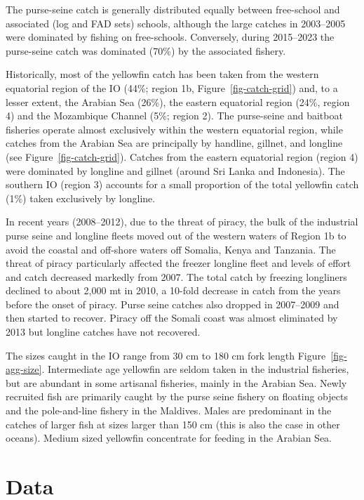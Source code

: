 \documentclass[
]{scrartcl}
\begin{document}
The purse-seine catch is generally distributed equally between
free-school and associated (log and FAD sets) schools, although the
large catches in 2003--2005 were dominated by fishing on free-schools.
Conversely, during 2015--2023 the purse-seine catch was dominated (70\%)
by the associated fishery.

Historically, most of the yellowfin catch has been taken from the
western equatorial region of the IO (44\%; region 1b,
Figure~\ref{fig-catch-grid}) and, to a lesser extent, the Arabian Sea
(26\%), the eastern equatorial region (24\%, region 4) and the
Mozambique Channel (5\%; region 2). The purse-seine and baitboat
fisheries operate almost exclusively within the western equatorial
region, while catches from the Arabian Sea are principally by handline,
gillnet, and longline (see Figure~\ref{fig-catch-grid}). Catches from
the eastern equatorial region (region 4) were dominated by longline and
gillnet (around Sri Lanka and Indonesia). The southern IO (region 3)
accounts for a small proportion of the total yellowfin catch (1\%) taken
exclusively by longline.

In recent years (2008--2012), due to the threat of piracy, the bulk of
the industrial purse seine and longline fleets moved out of the western
waters of Region 1b to avoid the coastal and off-shore waters off
Somalia, Kenya and Tanzania. The threat of piracy particularly affected
the freezer longline fleet and levels of effort and catch decreased
markedly from 2007. The total catch by freezing longliners declined to
about 2,000 mt in 2010, a 10-fold decrease in catch from the years
before the onset of piracy. Purse seine catches also dropped in
2007--2009 and then started to recover. Piracy off the Somali coast was
almost eliminated by 2013 but longline catches have not recovered.

The sizes caught in the IO range from 30 cm to 180 cm fork length
Figure~\ref{fig-agg-size}. Intermediate age yellowfin are seldom taken
in the industrial fisheries, but are abundant in some artisanal
fisheries, mainly in the Arabian Sea. Newly recruited fish are primarily
caught by the purse seine fishery on floating objects and the
pole-and-line fishery in the Maldives. Males are predominant in the
catches of larger fish at sizes larger than 150 cm (this is also the
case in other oceans). Medium sized yellowfin concentrate for feeding in
the Arabian Sea.

\section{Data}\label{data}
\end{document}

